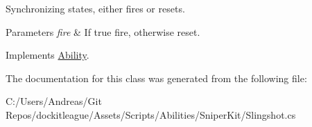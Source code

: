 Synchronizing states, either fires or resets. 


\begin{DoxyParams}{Parameters}
{\em fire} & If true fire, otherwise reset.\\
\hline
\end{DoxyParams}


Implements \hyperlink{class_ability_a10f7f3c2b63eeef6e352aee48d246384}{Ability}.



The documentation for this class was generated from the following file\+:\begin{DoxyCompactItemize}
\item 
C\+:/\+Users/\+Andreas/\+Git Repos/dockitleague/\+Assets/\+Scripts/\+Abilities/\+Sniper\+Kit/Slingshot.\+cs\end{DoxyCompactItemize}

